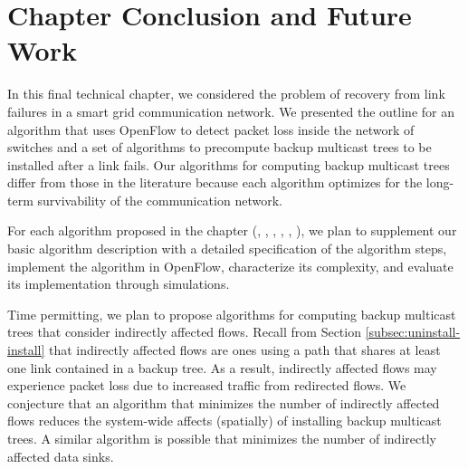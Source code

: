\section{Chapter Conclusion and Future Work}
\label{sec:conclude}

In this final technical chapter, we considered the problem of recovery from link failures in a smart grid communication network.  We presented the outline for an 
algorithm that uses OpenFlow to detect packet loss inside the network of switches and a set of algorithms to precompute backup multicast trees to be installed after
a link fails.  Our algorithms for computing backup multicast trees differ from those in the literature because each algorithm optimizes for the long-term survivability of the 
communication network. 


For each algorithm proposed in the chapter (\mdrs, \fls, \pcnts, \mfs, \mds, \mcs), we plan to supplement our basic algorithm description with a detailed specification of the algorithm steps,
implement the algorithm in OpenFlow, characterize its complexity, and evaluate its implementation through simulations.

Time permitting, we plan to propose algorithms for computing backup multicast trees that consider indirectly affected flows.  
Recall from Section \ref{subsec:uninstall-install} that indirectly affected flows are ones using a path that shares at least one link contained in a backup tree.
As a result, indirectly affected flows may experience packet loss due to increased traffic from redirected flows.  We conjecture that 
an algorithm that minimizes the number of indirectly affected flows reduces the system-wide affects (spatially) of installing backup multicast trees.
A similar algorithm is possible that minimizes the number of indirectly affected data sinks.







